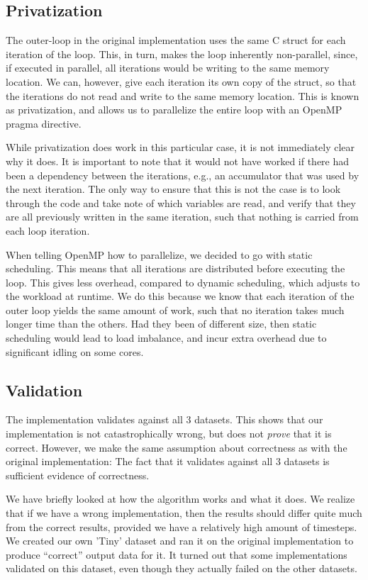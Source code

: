 \documentclass[11pt]{article}
\begin{document}
\subsection{Privatization}
The outer-loop in the original implementation uses the same C 
struct for each
iteration of the loop. This, in turn, makes the loop inherently non-parallel, since,
if executed in parallel, all iterations would be writing to the same memory location. 
We can, however, give each iteration its own copy of the
struct, so that the iterations do not read and write to the same memory location. This is 
known as privatization, and allows us to parallelize the entire loop
with an OpenMP pragma directive. 

While privatization does work in this particular case, it is not immediately clear why it does. It is
important to note that it would not have worked if there had been a dependency between the iterations,
e.g., an accumulator that was used by the next iteration. The only way to ensure
that this is not the case is to look through the code and take note of which 
variables are read, and verify that they are all previously written in the 
same iteration, such that nothing is carried from each loop iteration.

When telling OpenMP how to parallelize, we decided to go with static scheduling.
This means that all iterations are distributed before executing the loop. This gives
less overhead, compared to dynamic scheduling, which adjusts to the workload at runtime. We do
this because we know that each iteration of the outer loop yields the same
amount of work, such that no iteration takes much longer time than the others.
Had they been of different size, then static scheduling would lead to load 
imbalance, and incur extra overhead due to significant idling on some cores.


\subsection{Validation}
The implementation validates against all 3 datasets. This shows that our
implementation is not catastrophically wrong, but does not \emph{prove} that it is
correct. However, we make the same assumption about correctness as with the 
original implementation: The fact that it validates against all 3 datasets is sufficient evidence of correctness.

We have briefly looked at how the algorithm works and what it does. We
realize that if we have a wrong implementation, then the results should differ quite much from the correct results, provided we have a relatively high amount of timesteps. We created our own 'Tiny' dataset and ran it on the original implementation to produce ``correct'' output data for it. It turned out that some implementations validated on this dataset, even though they actually failed on the other datasets.
\end{document}
